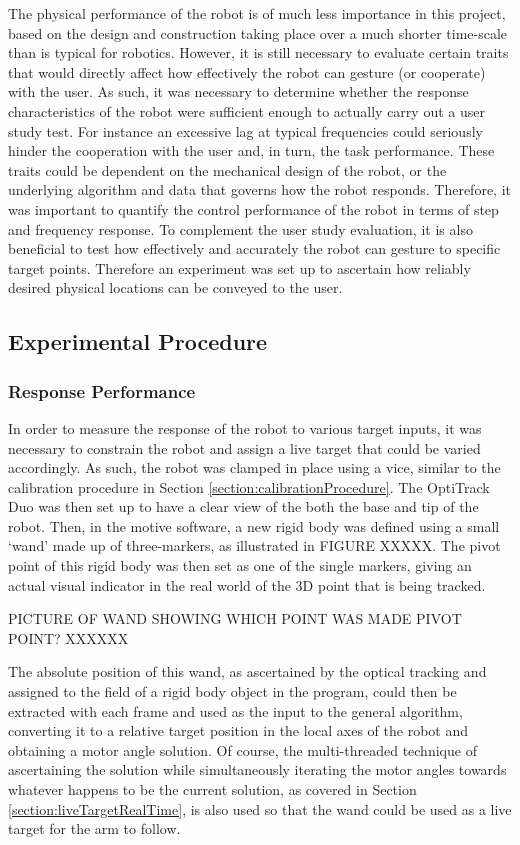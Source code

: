 \documentclass[11pt]{article}
\begin{document}
The physical performance of the robot is of much less importance in this project, based on the design and construction taking place over a much shorter time-scale than is typical for robotics. However, it is still necessary to evaluate certain traits that would directly affect how effectively the robot can gesture (or cooperate) with the user. As such, it was necessary to determine whether the response characteristics of the robot were sufficient enough to actually carry out a user study test. For instance an excessive lag at typical frequencies could seriously hinder the cooperation with the user and, in turn, the task performance. These traits could be dependent on the mechanical design of the robot, or the underlying algorithm and data that governs how the robot responds. Therefore, it was important to quantify the control performance of the robot in terms of step and frequency response. To complement the user study evaluation, it is also beneficial to test how effectively and accurately the robot can gesture to specific target points. Therefore an experiment was set up to ascertain how reliably desired physical locations can be conveyed to the user. 
\subsection{Experimental Procedure}

\subsubsection{Response Performance}
In order to measure the response of the robot to various target inputs, it was necessary to constrain the robot and assign a live target that could be varied accordingly. As such, the robot was clamped in place using a vice, similar to the calibration procedure in Section \ref{section:calibrationProcedure}. The OptiTrack Duo was then set up to have a clear view of the both the base and tip of the robot. Then, in the motive software, a new rigid body was defined using a small `wand' made up of three-markers, as illustrated in FIGURE XXXXX. The pivot point of this rigid body was then set as one of the single markers, giving an actual visual indicator in the real world of the 3D point that is being tracked.

PICTURE OF WAND SHOWING WHICH POINT WAS MADE PIVOT POINT? XXXXXX

The absolute position of this wand, as ascertained by the optical tracking and assigned to the field of a rigid body object in the program, could then be extracted with each frame and used as the input to the general algorithm, converting it to a relative target position in the local axes of the robot and obtaining a motor angle solution. Of course, the multi-threaded technique of ascertaining the solution while simultaneously iterating the motor angles towards whatever happens to be the current solution, as covered in Section \ref{section:liveTargetRealTime}, is also used so that the wand could be used as a live target for the arm to follow.
\end{document}
